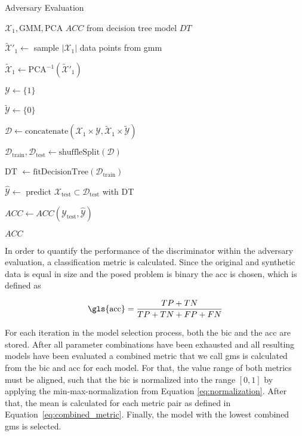 \documentclass[../../main.tex]{subfiles}
\begin{document}
\begin{algorithm}
    \caption{Adversary Evaluation}
    \label{alg:adversary_evaluation}
 
    \begin{algorithmic}[1]
        \REQUIRE $\mathcal{X}_1, \text{GMM}, \text{PCA}$
        \ENSURE $ACC$ from decision tree model $DT$

        \STATE $\tilde{\mathcal{X}}'_1 \leftarrow$ sample $|\mathcal{X}_1|$ data points from \gls{gmm}

        \STATE $\tilde{\mathcal{X}}_1 \leftarrow \text{PCA}^{-1}(\tilde{\mathcal{X}}'_1)$ 

        \STATE $\mathcal{Y} \leftarrow \{ 1 \}$
        
        \STATE $\tilde{\mathcal{Y}} \leftarrow \{ 0 \}$

        \STATE $\mathcal{D} \leftarrow \text{concatenate}(\mathcal{X}_1 \times \mathcal{Y}, \tilde{\mathcal{X}}_1 \times \tilde{\mathcal{Y}})$
        
        \STATE $\mathcal{D}_{\text{train}}, \mathcal{D}_{\text{test}} \leftarrow \text{shuffleSplit}(\mathcal{D})$

        \STATE DT $\leftarrow \text{fitDecisionTree}(\mathcal{D}_{\text{train}})$

        \STATE $\hat{\mathcal{Y}} \leftarrow$ predict $\mathcal{X}_{\text{test}} \subset \mathcal{D}_{\text{test}}$ with DT

        \STATE $ACC \leftarrow ACC(\mathcal{Y}_{\text{test}}, \hat{\mathcal{Y}})$

        \RETURN $ACC$
    \end{algorithmic}
 \end{algorithm}

In order to quantify the performance of the discriminator within the adversary evaluation, a classification metric is calculated. Since the original and synthetic data is equal in size and the posed problem is binary the \acrfull{acc} is chosen, which is defined as

 \begin{equation}
    \text{\gls{acc}} = \frac{TP + TN}{TP + TN + FP + FN}
 \end{equation}

 For each iteration in the model selection process, both the \gls{bic} and the \gls{acc} are stored. After all parameter combinations have been exhausted and all resulting models have been evaluated a combined metric that we call  \acrfull{gms} is calculated from the \gls{bic} and \gls{acc} for each model. For that, the value range of both metrics must be aligned, such that the \gls{bic} is normalized into the range $[0, 1]$ by applying the min-max-normalization from Equation \ref{eq:normalization}. After that, the mean is calculated for each metric pair as defined in Equation~\ref{eq:combined_metric}. Finally, the model with the lowest combined \gls{gms} is selected. 
 
\end{document}
